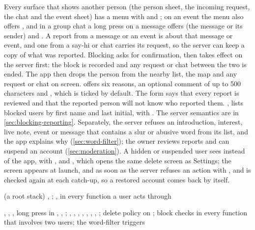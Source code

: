 Every surface that shows another person (the person sheet, the incoming request, the chat and the event
sheet) has a menu with  and ; on an event the menu also offers ,
and in a group chat a long press on a message offers  (the message or its sender) and
. A report from a message or an event is about that message or event, and one from a say-hi or
chat carries its request, so the server can keep a copy of what was reported. Blocking asks for confirmation, then takes effect on the server first: the block is recorded and any
request or chat between the two is ended. The app then drops the person from the nearby list, the map and
any request or chat on screen.  offers six reasons, an optional comment of up to 500 characters
and , which is ticked by default. The form says that every report is reviewed and that the
reported person will not know who reported them. ,  lists blocked
users by first name and last initial, with . The server semantics are in
\cref{sec:blocking-reporting}. Separately, the server refuses an introduction, interest, live note, event
or message that contains a slur or abusive word from its list, and the app explains why
(\cref{sec:word-filter}); the owner reviews reports and can suspend an account (\cref{sec:moderation}).
A hidden or suspended user sees  instead of the app, with ,
 and , which opens the same delete screen as Settings; the
screen appears at launch, and as soon as the server refuses an
action with , and is checked again at each catch-up, so a restored account comes
back by itself.

\implemented
  { (a root stack)}
  {, ; , }
  { in every function a user acts through}

\implemented
  {, , , long press in }
  {, , ; , , , }
  {, , , , ; delete policy on ; block checks in every function that involves two users; the word-filter triggers}

